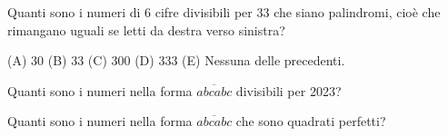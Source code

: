 \begin{esercizio}
    \label{ex:distrettuali_2021}
    Quanti sono i numeri di 6 cifre divisibili per 33 che siano palindromi, cioè che rimangano uguali
    se letti da destra verso sinistra?

    (A) 30 \quad (B) 33 \quad (C) 300 \quad (D) 333 \quad (E) Nessuna delle precedenti.
\end{esercizio}

\begin{esercizio}
    \label{ex:francesco_1}
    Quanti sono i numeri nella forma $\overline{abcabc}$ divisibili per 2023?
\end{esercizio}

\begin{esercizio}
    \label{ex:francesco_2}
    Quanti sono i numeri nella forma $\overline{abcabc}$ che sono quadrati perfetti?
\end{esercizio}